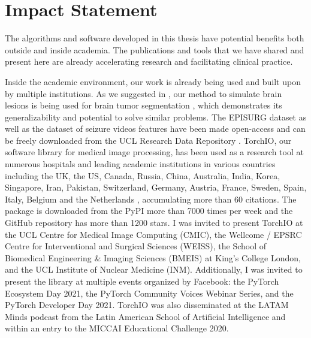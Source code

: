 \chapter{Impact Statement}

The algorithms and software developed in this thesis have potential benefits both outside and inside academia.
The publications and tools that we have shared and present here are already accelerating research and facilitating clinical practice.

Inside the academic environment, our work is already being used and built upon by multiple institutions.
As we suggested in \cite{perez-garcia_self-supervised_2021}, our method to simulate brain lesions is being used for brain tumor segmentation \cite{zhang_self-supervised_2021}, which demonstrates its generalizability and potential to solve similar problems.
The EPISURG dataset as well as the dataset of seizure videos features have been made open-access and can be freely downloaded from the UCL Research Data Repository \cite{perez-garcia_episurg_2020,perez-garcia_data_2021}.
TorchIO, our software library for medical image processing, has been used as a research tool at numerous hospitals and leading academic institutions in various countries including the UK, the US, Canada, Russia, China, Australia, India, Korea, Singapore, Iran, Pakistan, Switzerland, Germany, Austria, France, Sweden, Spain, Italy, Belgium and the Netherlands%
, accumulating more than 60 citations.
The package is downloaded from the \ac{PyPI} more than 7000 times per week and the GitHub repository has more than 1200 stars.
I was invited to present TorchIO at the UCL Centre for Medical Image Computing (CMIC), the Wellcome / EPSRC Centre for Interventional and Surgical Sciences (WEISS), the School of Biomedical Engineering \& Imaging Sciences (BMEIS) at King's College London, and the UCL Institute of Nuclear Medicine (INM).
Additionally, I was invited to present the library at multiple events organized by Facebook: the PyTorch Ecosystem Day 2021, the PyTorch Community Voices Webinar Series, and the PyTorch Developer Day 2021.
TorchIO was also disseminated at the LATAM Minds podcast from the Latin American School of Artificial Intelligence and within an entry to the MICCAI Educational Challenge 2020.

